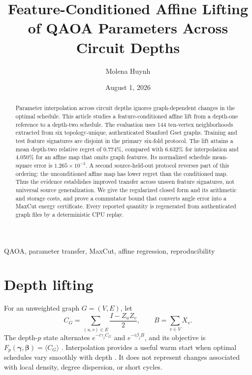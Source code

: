 \documentclass[10pt,letterpaper,twoside]{article}
\begin{document}
\title{Feature-Conditioned Affine Lifting of QAOA Parameters Across Circuit Depths}
\author{Molena Huynh}
\date{August 1, 2026}

\maketitle

\begin{abstract}
Parameter interpolation across circuit depths ignores graph-dependent changes
in the optimal schedule.  This article studies a feature-conditioned affine
lift from a depth-one reference to a depth-two schedule.  The evaluation uses
144 ten-vertex neighborhoods extracted from six topology-unique, authenticated
Stanford Gset graphs.  Training and test feature signatures are disjoint in the
primary six-fold protocol.  The lift attains a mean depth-two relative regret
of 0.774\%, compared with 6.632\% for interpolation and 4.050\% for an affine
map that omits graph features.  Its normalized schedule mean-square error is
$1.265\times10^{-3}$.  A second source-held-out protocol reverses part of this
ordering: the unconditioned affine map has lower regret than the conditioned
map.  Thus the evidence establishes improved transfer across unseen feature
signatures, not universal source generalization.  We give the regularized
closed form and its arithmetic and storage costs, and prove a commutator bound
that converts angle error into a MaxCut energy certificate.  Every reported
quantity is regenerated from authenticated graph files by a deterministic CPU
replay.
\end{abstract}

\begin{keywords}
QAOA, parameter transfer, MaxCut, affine regression, reproducibility
\end{keywords}

\section{Depth lifting}

For an unweighted graph $G=(V,E)$, let
\begin{equation}
 C_G=\sum_{(u,v)\in E}\frac{I-Z_uZ_v}{2},\qquad
 B=\sum_{v\in V}X_v .
\end{equation}
The depth-$p$ state alternates $e^{-i\gamma_jC_G}$ and
$e^{-i\beta_jB}$, and its objective is
$F_p(\bm\gamma,\bm\beta)=\langle C_G\rangle$ \cite{Farhi2014}.
Interpolation provides a useful warm start when optimal schedules vary
smoothly with depth \cite{Zhou2020,Apte2026}.  It does not represent changes
associated with local density, degree dispersion, or short cycles.
\end{document}
